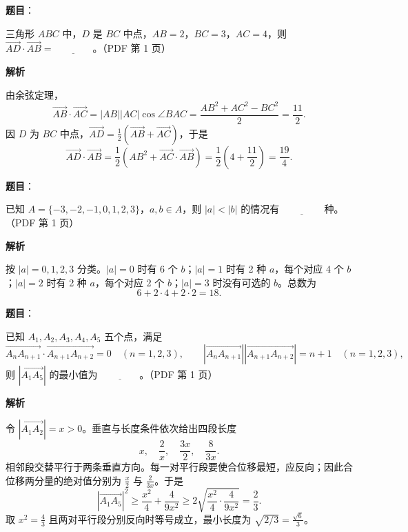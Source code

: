 \begin{answer}

\textbf{题目}：

三角形 $ABC$ 中，$D$ 是 $BC$ 中点，$AB=2$，$BC=3$，$AC=4$，则 $\overrightarrow{AD}\cdot\overrightarrow{AB}=\underline{\qquad\qquad}$。（PDF 第 1 页）

\textbf{解析}

由余弦定理，
\nopagebreak[4]
\[
\overrightarrow{AB}\cdot\overrightarrow{AC}
=|AB||AC|\cos\angle BAC
=\frac{AB^2+AC^2-BC^2}{2}
=\frac{11}{2}.
\]
因 $D$ 为 $BC$ 中点，$\overrightarrow{AD}=\frac12(\overrightarrow{AB}+\overrightarrow{AC})$，于是
\nopagebreak[4]
\[
\overrightarrow{AD}\cdot\overrightarrow{AB}
=\frac12\left(AB^2+\overrightarrow{AC}\cdot\overrightarrow{AB}\right)
=\frac12\left(4+\frac{11}{2}\right)=\frac{19}{4}.
\]


\end{answer}
\begin{answer}

\textbf{题目}：

已知 $A=\{-3,-2,-1,0,1,2,3\}$，$a,b\in A$，则 $|a|<|b|$ 的情况有 $\underline{\qquad\qquad}$ 种。（PDF 第 1 页）

\textbf{解析}

按 $|a|=0,1,2,3$ 分类。$|a|=0$ 时有 6 个 $b$；$|a|=1$ 时有 2 种 $a$，每个对应 4 个 $b$；$|a|=2$ 时有 2 种 $a$，每个对应 2 个 $b$；$|a|=3$ 时没有可选的 $b$。总数为
\nopagebreak[4]
\[
6+2\cdot4+2\cdot2=18.
\]


\end{answer}
\begin{answer}

\textbf{题目}：

已知 $A_1,A_2,A_3,A_4,A_5$ 五个点，满足
\nopagebreak[4]
\[
\overrightarrow{A_nA_{n+1}}\cdot\overrightarrow{A_{n+1}A_{n+2}}=0\quad(n=1,2,3),\qquad
\left|\overrightarrow{A_nA_{n+1}}\right|\left|\overrightarrow{A_{n+1}A_{n+2}}\right|=n+1\quad(n=1,2,3),
\]
则 $\left|\overrightarrow{A_1A_5}\right|$ 的最小值为 $\underline{\qquad\qquad}$。（PDF 第 1 页）

\textbf{解析}

令 $|\overrightarrow{A_1A_2}|=x>0$。垂直与长度条件依次给出四段长度
\nopagebreak[4]
\[
x,\quad\frac2x,\quad\frac{3x}{2},\quad\frac8{3x}.
\]
相邻段交替平行于两条垂直方向。每一对平行段要使合位移最短，应反向；因此合位移两分量的绝对值分别为 $\frac{x}{2}$ 与 $\frac{2}{3x}$。于是
\nopagebreak[4]
\[
|\overrightarrow{A_1A_5}|^2\ge \frac{x^2}{4}+\frac4{9x^2}
\ge 2\sqrt{\frac{x^2}{4}\cdot\frac4{9x^2}}=\frac23.
\]
取 $x^2=\frac43$ 且两对平行段分别反向时等号成立，最小长度为 $\sqrt{2/3}=\frac{\sqrt6}{3}$。


\end{answer}
